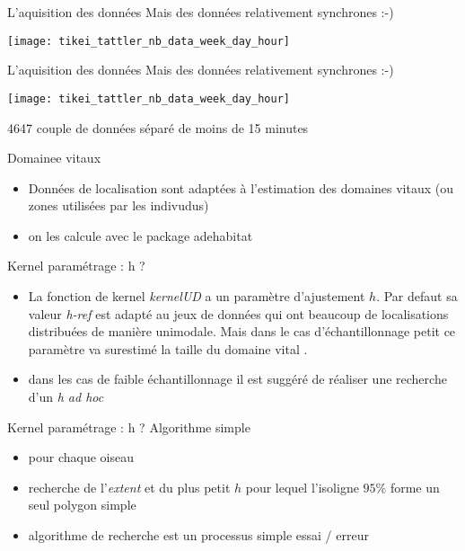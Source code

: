 \documentclass[10pt,compress]{beamer}
\begin{document}
\begin{frame}{L'aquisition des données}
  Mais des données relativement synchrones :-)\\
  \begin{center}
    \texttt{[image: tikei\_tattler\_nb\_data\_week\_day\_hour]}
  \end{center}
\end{frame}

\begin{frame}{L'aquisition des données}
  Mais des données relativement synchrones :-)\\
  \begin{center}
    \texttt{[image: tikei\_tattler\_nb\_data\_week\_day\_hour]}
  \end{center}
    {\footnotesize 4647 couple de données séparé de moins de 15 minutes}
\end{frame}


\begin{frame} {Domainee vitaux}
  \begin{itemize}
  \item Données de localisation sont adaptées à l'estimation des
    domaines vitaux (ou zones utilisées par les indivudus) {\tiny \cite{Kie2010}}
  \item on les calcule avec le package adehabitat {\tiny \cite{Calenge2015,Calenge2006} }
  \end{itemize}
\end{frame}


\begin{frame}{Kernel paramétrage : h ?}
  \begin{itemize}
  \item La fonction de kernel \textit{kernelUD} a un paramètre d'ajustement
    $h$. Par defaut sa valeur \textit{h-ref} est adapté au jeux de
    données qui ont beaucoup de localisations distribuées de manière unimodale. Mais dans le cas
    d'échantillonnage petit ce paramètre va surestimé la taille du domaine
    vital {\tiny \cite{Schuler2014}}.
  \item dans les cas de faible échantillonnage il est suggéré de
    réaliser une recherche d'un \textit{h ad hoc } {\tiny \cite{Schuler2014}}
  \end{itemize}
\end{frame}


\begin{frame}{Kernel paramétrage : h ?}
  Algorithme simple
  \begin{itemize}
  \item pour chaque oiseau
  \item recherche de l'\textit{extent} et du plus petit $h$ pour lequel l'isoligne
    $95\%$ forme un seul polygon simple
  \item algorithme de recherche est un processus simple  essai / erreur
  \end{itemize}
\end{frame}
\end{document}
